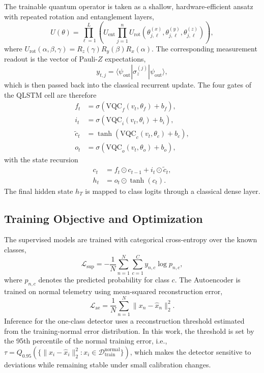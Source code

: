 The trainable quantum operator is taken as a shallow, hardware-efficient ansatz with repeated rotation and entanglement layers,
\begin{equation}
U(\theta)=\prod_{\ell=1}^{L}\left(U_{\mathrm{ent}}\prod_{j=1}^{n}U_{\mathrm{rot}}(\theta^{(x)}_{j,\ell},\theta^{(y)}_{j,\ell},\theta^{(z)}_{j,\ell})\right),
\end{equation}
where $U_{\mathrm{rot}}(\alpha,\beta,\gamma)=R_z(\gamma)R_y(\beta)R_x(\alpha)$. The corresponding measurement readout is the vector of Pauli-$Z$ expectations,
\begin{equation}
 y_{t,j}=\langle\psi_{\mathrm{out}}|\sigma_z^{(j)}|\psi_{\mathrm{out}}\rangle,
\end{equation}
which is then passed back into the classical recurrent update. The four gates of the QLSTM cell are therefore
\begin{align}
f_t &= \sigma(\mathrm{VQC}_f(v_t,\theta_f)+b_f), \\
i_t &= \sigma(\mathrm{VQC}_i(v_t,\theta_i)+b_i), \\
\tilde{c}_t &= \tanh(\mathrm{VQC}_c(v_t,\theta_c)+b_c), \\
o_t &= \sigma(\mathrm{VQC}_o(v_t,\theta_o)+b_o),
\end{align}
with the state recursion
\begin{align}
c_t &= f_t \odot c_{t-1} + i_t \odot \tilde{c}_t, \\
h_t &= o_t \odot \tanh(c_t).
\end{align}
The final hidden state $h_T$ is mapped to class logits through a classical dense layer.

\subsection{Training Objective and Optimization}
The supervised models are trained with categorical cross-entropy over the known classes,
\begin{equation}
\mathcal{L}_{\mathrm{sup}}=-\frac{1}{N}\sum_{n=1}^{N}\sum_{c=1}^{C} y_{n,c}\log p_{n,c},
\end{equation}
where $p_{n,c}$ denotes the predicted probability for class $c$. The Autoencoder is trained on normal telemetry using mean-squared reconstruction error,
\begin{equation}
\mathcal{L}_{\mathrm{ae}}=\frac{1}{N}\sum_{n=1}^{N}\lVert x_n-\hat{x}_n\rVert_2^2.
\end{equation}
Inference for the one-class detector uses a reconstruction threshold estimated from the training-normal error distribution. In this work, the threshold is set by the 95th percentile of the normal training error, i.e., $\tau = Q_{0.95}(\{\|x_i-\hat{x}_i\|_2^2 : x_i \in \mathcal{D}^{\mathrm{normal}}_{\mathrm{train}}\})$, which makes the detector sensitive to deviations while remaining stable under small calibration changes.

